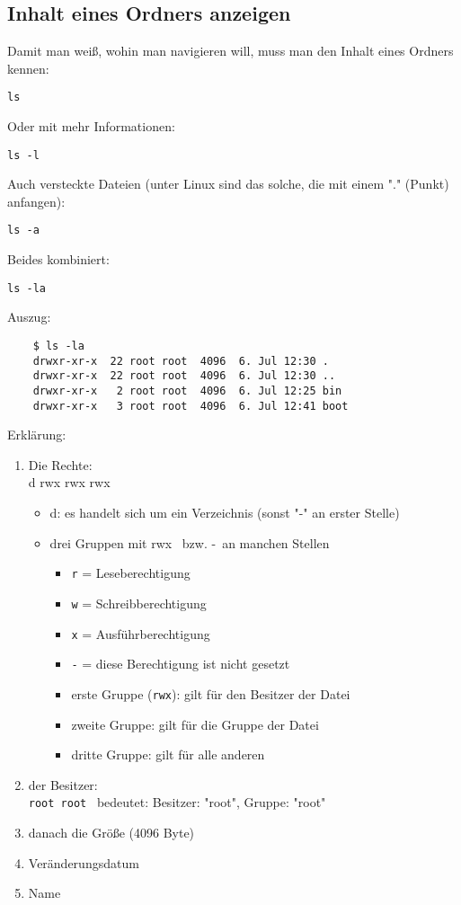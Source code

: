 \documentclass[a4paper,10pt]{article}
\begin{document}
\subsection{Inhalt eines Ordners anzeigen}
Damit man weiß, wohin man navigieren will, muss man den Inhalt eines 
Ordners kennen:  
\begin{lstlisting}
ls
\end{lstlisting} 
Oder mit mehr Informationen: 
\begin{lstlisting}
ls -l
\end{lstlisting} 
Auch versteckte Dateien (unter Linux sind das solche, die mit 
einem "." (Punkt) anfangen):
\begin{lstlisting}
ls -a
\end{lstlisting} 
Beides kombiniert:
\begin{lstlisting}
ls -la
\end{lstlisting} 
Auszug: 
\begin{verbatim}
	$ ls -la
	drwxr-xr-x  22 root root  4096  6. Jul 12:30 .
	drwxr-xr-x  22 root root  4096  6. Jul 12:30 ..
	drwxr-xr-x   2 root root  4096  6. Jul 12:25 bin
	drwxr-xr-x   3 root root  4096  6. Jul 12:41 boot
\end{verbatim}
Erklärung: 
\begin{enumerate}
\item Die Rechte: \\
d rwx rwx rwx
\begin{itemize}
\item d: es handelt sich um ein Verzeichnis (sonst "-" an erster Stelle)
\item drei Gruppen mit \glqq rwx\grqq~ bzw. \glqq -\grqq ~an manchen Stellen
\begin{itemize}
\item \texttt{r} = Leseberechtigung
\item \texttt{w} = Schreibberechtigung
\item \texttt{x} = Ausführberechtigung
\item \texttt{\glqq -\grqq} = diese Berechtigung ist nicht gesetzt
\item erste Gruppe (\glqq \texttt{rwx}\grqq ): gilt für den Besitzer der Datei
\item zweite Gruppe: gilt für die Gruppe der Datei
\item dritte Gruppe: gilt für alle anderen
\end{itemize}
\end{itemize}
\item der Besitzer: \\
\texttt{root root} ~bedeutet: Besitzer: "root", Gruppe: "root"
\item danach die Größe (4096 Byte)
\item Veränderungsdatum
\item Name
\end{enumerate}
\end{document}
